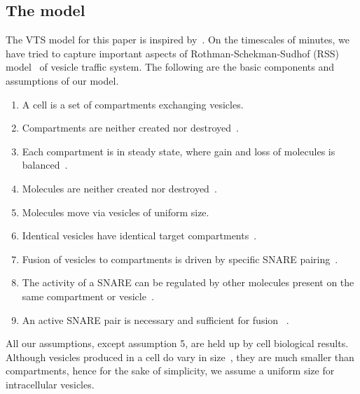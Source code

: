 \subsection{The model}
\noindent The VTS model for this paper is inspired by~\cite{shukla2017discovering}. 
%
On the timescales of minutes, we have tried to capture important aspects of Rothman-Schekman-Sudhof (RSS) model~\cite{rothman2002machinery} of vesicle traffic system.
%
The following are the basic components and assumptions of our model. 
\begin{enumerate}
\item A cell is a set of compartments exchanging vesicles.
\item Compartments are neither created nor destroyed~\cite{braell1984glycoprotein}.
\item Each compartment is in steady state, where gain and loss of molecules is balanced~\cite{braell1984glycoprotein}.
\item Molecules are neither created nor destroyed~\cite{he2009differential}.
\item Molecules move via vesicles of uniform size.
\item Identical vesicles have identical target compartments~\cite{fries1981transient}.
\item Fusion of vesicles to compartments is driven by specific SNARE pairing~\cite{mcnew2000compartmental}.
\item The activity of a SNARE can be regulated by other molecules present on the same compartment or vesicle~\cite{mima2008reconstituted}.
\item An active SNARE pair is necessary and sufficient for fusion~\cite{weber1998snarepins}
. 
\end{enumerate}
%
All our assumptions, except assumption 5, are held up by cell biological results.
%
Although vesicles produced in a cell do vary in size~\cite{jena2008intracellular}, they are much smaller than compartments, hence for the sake of simplicity, we assume a uniform size for intracellular vesicles.

